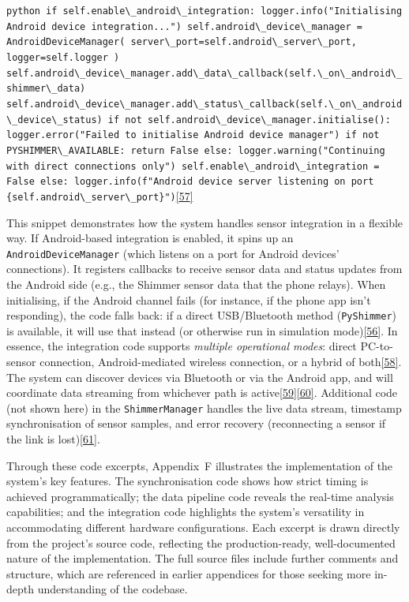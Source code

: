 \documentclass[12pt,a4paper]{article}
\begin{document}
\passthrough{\lstinline!python if self.enable\_android\_integration: logger.info("Initialising Android device integration...") self.android\_device\_manager = AndroidDeviceManager( server\_port=self.android\_server\_port, logger=self.logger ) self.android\_device\_manager.add\_data\_callback(self.\_on\_android\_shimmer\_data) self.android\_device\_manager.add\_status\_callback(self.\_on\_android\_device\_status) if not self.android\_device\_manager.initialise(): logger.error("Failed to initialise Android device manager") if not PYSHIMMER\_AVAILABLE: return False else: logger.warning("Continuing with direct connections only") self.enable\_android\_integration = False else: logger.info(f"Android device server listening on port \{self.android\_server\_port\}")!}\href{PythonApp/shimmer_manager.py\#L241-L258}{{[}57{]}}

This snippet demonstrates how the system handles sensor integration in a flexible way. If Android-based integration is enabled, it spins up an \passthrough{\lstinline!AndroidDeviceManager!} (which listens on a port for Android devices' connections). It registers callbacks to receive sensor data and status updates from the Android side (e.g., the Shimmer sensor data that the phone relays). When initialising, if the Android channel fails (for instance, if the phone app isn't responding), the code falls back: if a direct USB/Bluetooth method (\passthrough{\lstinline!PyShimmer!}) is available, it will use that instead (or otherwise run in simulation mode)\href{PythonApp/shimmer_manager.py\#L250-L258}{{[}56{]}}. In essence, the integration code supports \emph{multiple operational modes}: direct PC-to-sensor connection, Android-mediated wireless connection, or a hybrid of both\href{PythonApp/shimmer_manager.py\#L134-L143}{{[}58{]}}. The system can discover devices via Bluetooth or via the Android app, and will coordinate data streaming from whichever path is active\href{PythonApp/shimmer_manager.py\#L269-L278}{{[}59{]}}\href{PythonApp/shimmer_manager.py\#L280-L289}{{[}60{]}}. Additional code (not shown here) in the \passthrough{\lstinline!ShimmerManager!} handles the live data stream, timestamp synchronisation of sensor samples, and error recovery (reconnecting a sensor if the link is lost)\href{PythonApp/shimmer_manager.py\#L145-L151}{{[}61{]}}.

Through these code excerpts, Appendix~F illustrates the implementation of the system's key features. The synchronisation code shows how strict timing is achieved programmatically; the data pipeline code reveals the real-time analysis capabilities; and the integration code highlights the system's versatility in accommodating different hardware configurations. Each excerpt is drawn directly from the project's source code, reflecting the production-ready, well-documented nature of the implementation. The full source files include further comments and structure, which are referenced in earlier appendices for those seeking more in-depth understanding of the codebase.
\end{document}

